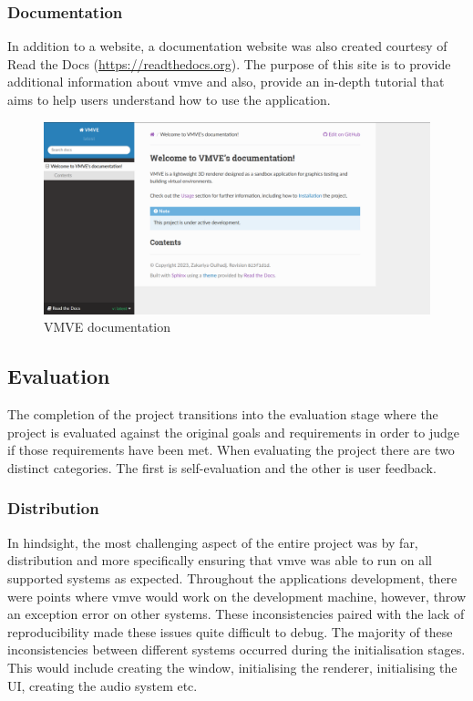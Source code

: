 \documentclass[11pt]{article}
\begin{document}
\subsubsection{Documentation}
In addition to a website, a documentation website was also created courtesy of
Read the Docs (\href{https://readthedocs.org}{https://readthedocs.org}). The
purpose of this site is to provide additional information about \gls*{vmve} and
also, provide an in-depth tutorial that aims to help users understand how to use
the application.

\begin{figure}[H]
  \centering
  \includegraphics[width=\textwidth]{images/documentation.png}
  \caption{VMVE documentation}
  \label{fig:documentation}
\end{figure}


\subsection{Evaluation} \label{evaluation}
The completion of the project transitions into the evaluation stage where the
project is evaluated against the original goals and requirements in order to
judge if those requirements have been met. When evaluating the project there are
two distinct categories. The first is self-evaluation and the other is user
feedback.


\subsubsection{Distribution}
In hindsight, the most challenging aspect of the entire project was by far,
distribution and more specifically ensuring that \gls*{vmve} was able to run on
all supported systems as expected. Throughout the applications development,
there were points where \gls*{vmve} would work on the development machine,
however, throw an exception error on other systems. These inconsistencies paired
with the lack of reproducibility made these issues quite difficult to debug. The
majority of these inconsistencies between different systems occurred during the
initialisation stages. This would include creating the window, initialising the
renderer, initialising the UI, creating the audio system etc.
\end{document}
